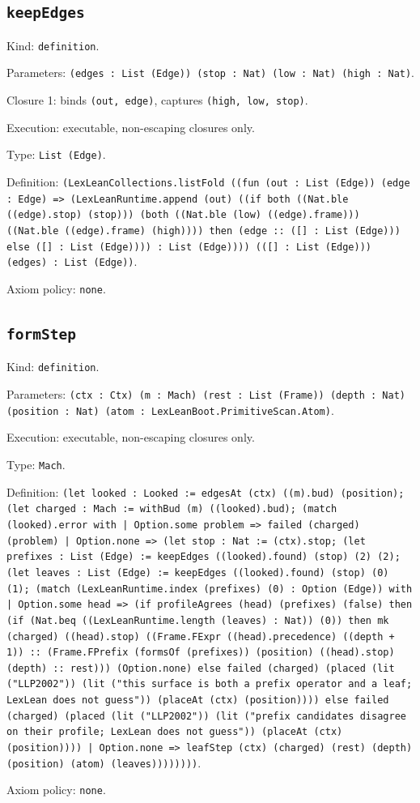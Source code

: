\documentclass[11pt]{article}
\begin{document}
\subsection*{\texttt{keepEdges}}
\noindent Kind: \texttt{definition}.\par
\noindent Parameters: \texttt{(edges : List (Edge)) (stop : Nat) (low : Nat) (high : Nat)}.\par
\noindent Closure 1: binds \texttt{(out, edge)}, captures \texttt{(high, low, stop)}.\par
\noindent Execution: executable, non-escaping closures only.\par
\noindent Type: \texttt{List (Edge)}.\par
\noindent Definition: \texttt{(LexLeanCollections.listFold ((fun (out : List (Edge)) (edge : Edge) => (LexLeanRuntime.append (out) ((if both ((Nat.ble ((edge).stop) (stop))) (both ((Nat.ble (low) ((edge).frame))) ((Nat.ble ((edge).frame) (high)))) then (edge :: ([] : List (Edge))) else ([] : List (Edge)))) : List (Edge)))) (([] : List (Edge))) (edges) : List (Edge))}.\par
\noindent Axiom policy: \texttt{none}.\par
\subsection*{\texttt{formStep}}
\noindent Kind: \texttt{definition}.\par
\noindent Parameters: \texttt{(ctx : Ctx) (m : Mach) (rest : List (Frame)) (depth : Nat) (position : Nat) (atom : LexLeanBoot.PrimitiveScan.Atom)}.\par
\noindent Execution: executable, non-escaping closures only.\par
\noindent Type: \texttt{Mach}.\par
\noindent Definition: \texttt{(let looked : Looked := edgesAt (ctx) ((m).bud) (position); (let charged : Mach := withBud (m) ((looked).bud); (match (looked).error with | Option.some problem => failed (charged) (problem) | Option.none => (let stop : Nat := (ctx).stop; (let prefixes : List (Edge) := keepEdges ((looked).found) (stop) (2) (2); (let leaves : List (Edge) := keepEdges ((looked).found) (stop) (0) (1); (match (LexLeanRuntime.index (prefixes) (0) : Option (Edge)) with | Option.some head => (if profileAgrees (head) (prefixes) (false) then (if (Nat.beq ((LexLeanRuntime.length (leaves) : Nat)) (0)) then mk (charged) ((head).stop) ((Frame.FExpr ((head).precedence) ((depth + 1)) :: (Frame.FPrefix (formsOf (prefixes)) (position) ((head).stop) (depth) :: rest))) (Option.none) else failed (charged) (placed (lit ("LLP2002")) (lit ("this surface is both a prefix operator and a leaf; LexLean does not guess")) (placeAt (ctx) (position)))) else failed (charged) (placed (lit ("LLP2002")) (lit ("prefix candidates disagree on their profile; LexLean does not guess")) (placeAt (ctx) (position)))) | Option.none => leafStep (ctx) (charged) (rest) (depth) (position) (atom) (leaves))))))))}.\par
\noindent Axiom policy: \texttt{none}.\par
\end{document}
